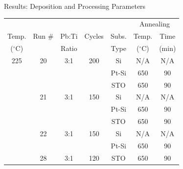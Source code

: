 \documentclass[professionalfont]{beamer}
\newcommand{\degC}{$^{\circ}$C}
\begin{document}
\begin{frame}{Results: Deposition and Processing Parameters}
	\vfill
	\begin{center}
	\begin{tabular}{ccccccc}
	\toprule
	&&&&&\multicolumn{2}{c}{Annealing}\\ \cmidrule{6-7}
	Temp.		&Run \#	&Pb:Ti	 &Cycles 	&Subs. 		&Temp. 		&Time \\ 
	(\degC{})		&		&Ratio	&		&Type		&(\degC{})	&(min) \\ \midrule%
	225			&20		&3:1		&200	&Si		 	&N/A			&N/A		\\
				&		&		&		&Pt-Si		&650		&90		\\
				&		&		&		&STO		&650		&90		\\
				&21		&3:1		&150	&Si		 	&N/A			&N/A		\\
				&		&		&		&Pt-Si		&650		&90		\\
				&		&		&		&STO		&650		&90		\\
				&22		&3:1		&150	&Si		 	&N/A			&N/A		\\
				&		&		&		&Pt-Si		&650		&90		\\
				&28		&3:1		&120	&STO		&650		&90		\\				
	\bottomrule
	\end{tabular}
	\end{center}
	\vfill
\end{frame}
\end{document}
